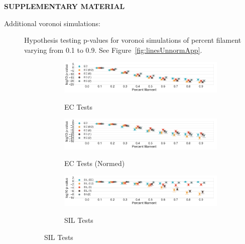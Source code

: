 \documentclass[12pt]{article}
\newcommand{\figref}[1]{Figure~\ref{#1}}
\begin{document}

\bigskip
\begin{center}
{\large\bf SUPPLEMENTARY MATERIAL}
\end{center}

\begin{description}
  \item[Additional voronoi simulations:] Hypothesis testing p-values for voronoi simulations of percent filament varying from 0.1 to 0.9. See \figref{fig:linesUnnormApp}.

  \begin{center}
    \begin{figure}[htp!]
      \centering
      \begin{subfigure}{.45\textwidth}
        \centering
        \caption{EC Tests}
        \includegraphics[width=\linewidth]{figure_8_all_euler_group.pdf}
        \label{fig:all_euler}
      \end{subfigure}
      \begin{subfigure}{.45\textwidth}
        \centering
        \caption{EC Tests (Normed)}
        \includegraphics[width=\linewidth]{figure_8_all_euler_group_normed.pdf}
        \label{fig:all_euler_normed}
      \end{subfigure}
      \begin{subfigure}{.45\textwidth}
        \centering
        \caption{SIL Tests}
        \includegraphics[width=\linewidth]{figure_8_all_silhouette_group.pdf}
        \label{fig:all_silh}
      \end{subfigure}

\end{figure}
\end{center}
\end{description}
\end{document}
